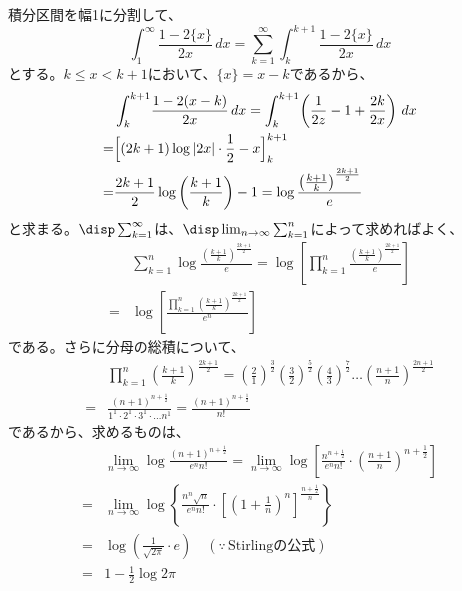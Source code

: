 積分区間を幅1に分割して、
\[ \int_1^\infty\! \frac{1-2\{x\}}{2x} \,dx = \sum_{k=1}^\infty \int_k^{k+1}\!\frac{1-2\{x\}}{2x} \,dx \]
とする。$k\le x < k+1$において、$\{x\}=x-k$であるから、
\begin{align*}
 &\int_k^{k+1}\!\frac{1-2(x-k)}{2x} \,dx = \int_k^{k+1}\!\left(\frac{1}{2z}-1+\frac{2k}{2x}\right) \,dx \\
 =& \Bigl[(2k+1)\log|2x|\cdot\frac{1}{2}-x\Bigr]_k^{k+1} \\
 =& \frac{2k+1}{2}\log\left(\frac{k+1}{k}\right)-1 = \log\frac{\left(\frac{k+1}{k}\right)^{\frac{2k+1}{2}}}{e}
\end{align*}
と求まる。$\disp \sum_{k=1}^\infty$は、$\disp \lim_{n\to\infty}\sum_{k=1}^n$によって求めればよく、
\begin{align*}
 &\sum_{k=1}^n\log\frac{\left(\frac{k+1}{k}\right)^{\frac{2k+1}{2}}}{e} = \log\left[\prod_{k=1}^n\frac{\left(\frac{k+1}{k}\right)^{\frac{2k+1}{2}}}{e}\right] \\
 =& \log\left[\frac{\prod_{k=1}^n \left(\frac{k+1}{k}\right)^{\frac{2k+1}{2}}}{e^n}\right]
\end{align*}
である。さらに分母の総積について、
\begin{align*}
 &\prod_{k=1}^n\left(\frac{k+1}{k}\right)^{\frac{2k+1}{2}} = \left(\frac{2}{1}\right)^{\frac{3}{2}}\left(\frac{3}{2}\right)^{\frac{5}{2}}\left(\frac{4}{3}\right)^{\frac{7}{2}}\dots\left(\frac{n+1}{n}\right)^{\frac{2n+1}{2}} \\
 =& \frac{(n+1)^{n+\frac{1}{2}}}{1^1\cdot 2^1\cdot 3^1\cdot \dots n^1} = \frac{(n+1)^{n+\frac{1}{2}}}{n!}
\end{align*}
であるから、求めるものは、
\begin{align*}
 &\lim_{n\to\infty} \log\frac{(n+1)^{n+\frac{1}{2}}}{e^n n!} = \lim_{n\to\infty}\log\left[\frac{n^{n+\frac{1}{2}}}{e^n n!}\cdot\left(\frac{n+1}{n}\right)^{n+\frac{1}{2}}\right] \\
 =& \lim_{n\to\infty} \log\left\{\frac{n^n\sqrt{n}}{e^n n!}\cdot \left[\left(1+\frac{1}{n}\right)^n\right]^{\frac{n+\frac{1}{2}}{n}}\right\} \\
 =& \log\left(\frac{1}{\sqrt{2\pi}}\cdot e\right) \quad (\because\, \text{Stirlingの公式}) \\
 =& 1-\frac{1}{2}\log{2\pi}
\end{align*}